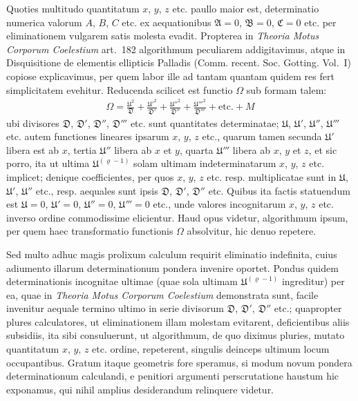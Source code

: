 \documentclass[12pt,a4paper]{book}
\begin{document}
Quoties multitudo quantitatum $x$, $y$, $z$ etc. paullo maior est, determinatio numerica valorum $A$, $B$, $C$ etc. ex aequationibus $\mathfrak{A}=0$, $\mathfrak{B}=0$, $\mathfrak{C}=0$ etc. per eliminationem vulgarem satis molesta evadit. Propterea in \textit{Theoria Motus Corporum Coelestium} art.~182 algorithmum peculiarem addigitavimus, atque in Disquisitione de elementis ellipticis Palladis (Comm. recent. Soc. Gotting. Vol.~I) copiose explicavimus, per quem labor ille ad tantam quantam quidem res fert simplicitatem evehitur. Reducenda scilicet est functio $\Omega$ sub formam talem:
%
\begin{multline*}
\Omega=\frac{\mathfrak{U}^2}{\mathfrak{D}}+\frac{\mathfrak{U}'^2}{\mathfrak{D}'}+\frac{\mathfrak{U}''^2}{\mathfrak{D}''}+\frac{\mathfrak{U}'''^2}{\mathfrak{D}'''}+\text{etc.}+M
\end{multline*}
ubi divisores $\mathfrak{D}$, $\mathfrak{D}'$, $\mathfrak{D}''$, $\mathfrak{D}'''$ etc. sunt quantitates determinatae; $\mathfrak{U}$, $\mathfrak{U}'$, $\mathfrak{U}''$, $\mathfrak{U}'''$ etc. autem functiones lineares ipsarum $x$, $y$, $z$ etc., quarum tamen secunda $\mathfrak{U}'$ libera est ab $x$, tertia $\mathfrak{U}''$ libera ab $x$ et $y$, quarta $\mathfrak{U}'''$ libera ab $x$, $y$ et $z$, et sic porro, ita ut ultima $\mathfrak{U}^{(\varrho-1)}$ solam ultimam indeterminatarum $x$, $y$, $z$ etc. implicet; denique coefficientes, per quos $x$, $y$, $z$ etc. resp. multiplicatae sunt in $\mathfrak{U}$, $\mathfrak{U}'$, $\mathfrak{U}''$ etc., resp. aequales sunt ipsis $\mathfrak{D}$, $\mathfrak{D}'$, $\mathfrak{D}''$ etc. Quibus ita factis statuendum est $\mathfrak{U}=0$, $\mathfrak{U}'=0$, $\mathfrak{U}''=0$, $\mathfrak{U}'''=0$ etc., unde valores incognitarum $x$, $y$, $z$ etc. inverso ordine commodissime elicientur. Haud opus videtur, algorithmum ipsum, per quem haec transformatio functionis $\Omega$ absolvitur, hic denuo repetere.

Sed multo adhuc magis prolixum calculum requirit eliminatio indefinita, cuius adiumento illarum determinationum pondera invenire oportet. Pondus quidem determinationis incognitae ultimae (quae sola ultimam $\mathfrak{U}^{(\varrho-1)}$ ingreditur) per ea, quae in \textit{Theoria Motus Corporum Coelestium} demonstrata sunt, facile invenitur aequale termino ultimo in serie divisorum $\mathfrak{D}$, $\mathfrak{D}'$, $\mathfrak{D}''$ etc.; quapropter plures calculatores, ut eliminationem illam molestam evitarent, deficientibus aliis subsidiis, ita sibi consuluerunt, ut algorithmum, de quo diximus pluries, mutato quantitatum $x$, $y$, $z$ etc. ordine, repeterent, singulis deinceps ultimum locum occupantibus. Gratum itaque geometris fore speramus, si modum novum pondera determinationum calculandi, e penitiori argumenti perscrutatione haustum hic exponamus, qui nihil amplius desiderandum relinquere videtur.
\end{document}
